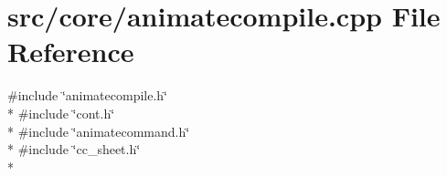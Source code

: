 \hypertarget{a00199}{\section{src/core/animatecompile.cpp File Reference}
\label{a00199}
}
{\ttfamily \#include \char`\"{}animatecompile.\-h\char`\"{}}\\*
{\ttfamily \#include \char`\"{}cont.\-h\char`\"{}}\\*
{\ttfamily \#include \char`\"{}animatecommand.\-h\char`\"{}}\\*
{\ttfamily \#include \char`\"{}cc\-\_\-sheet.\-h\char`\"{}}\\*
